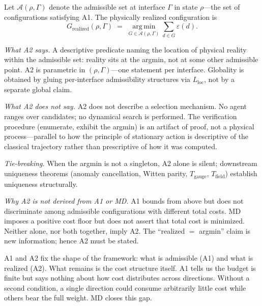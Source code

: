 \documentclass[11pt]{article}
\theoremstyle{remark}
\begin{document}
\begin{tcolorbox}[defbox, title={Axiom A2 (Minimum Cost)}]
Let $\mathcal{A}(\rho, \Gamma)$ denote the admissible set at interface $\Gamma$ in state $\rho$---the set of configurations satisfying A1.  The physically realized configuration is
\[
G_{\mathrm{realized}}(\rho, \Gamma) \;=\; \operatorname*{arg\,min}_{G \in \mathcal{A}(\rho, \Gamma)} \sum_{d \in G} \varepsilon(d).
\]

\smallskip\noindent\textit{What A2 says.}  A descriptive predicate naming the location of physical reality within the admissible set: reality sits at the argmin, not at some other admissible point.  A2 is parametric in $(\rho, \Gamma)$---one statement per interface.  Globality is obtained by gluing per-interface admissibility structures via $L_{\mathrm{loc}}$, not by a separate global claim.

\smallskip\noindent\textit{What A2 does not say.}  A2 does not describe a selection mechanism.  No agent ranges over candidates; no dynamical search is performed.  The verification procedure (enumerate, exhibit the argmin) is an artifact of proof, not a physical process---parallel to how the principle of stationary action is descriptive of the classical trajectory rather than prescriptive of how it was computed.

\smallskip\noindent\textit{Tie-breaking.}  When the argmin is not a singleton, A2 alone is silent; downstream uniqueness theorems (anomaly cancellation, Witten parity, $T_{\mathrm{gauge}}$, $T_{\mathrm{field}}$) establish uniqueness structurally.

\smallskip\noindent\textit{Why A2 is not derived from A1 or MD.}  A1 bounds from above but does not discriminate among admissible configurations with different total costs.  MD imposes a positive cost floor but does not assert that total cost is minimized.  Neither alone, nor both together, imply A2.  The ``realized $=$ argmin'' claim is new information; hence A2 must be stated.
\end{tcolorbox}

\smallskip\noindent A1 and A2 fix the shape of the framework: what is admissible (A1) and what is realized (A2).  What remains is the cost structure itself.  A1 tells us the budget is finite but says nothing about how cost distributes across directions.  Without a second condition, a single direction could consume arbitrarily little cost while others bear the full weight.  MD closes this gap.
\end{document}
